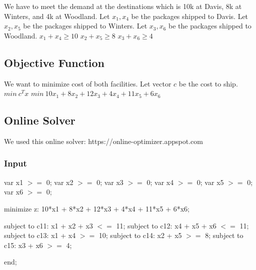 \documentclass[14pt]{extarticle}
\begin{document}
\bigskip

We have to meet the demand at the destinations which is 10k at Davis, 8k at Winters, and 4k at Woodland. Let $x_1, x_4$ be the packages shipped to Davis. Let $x_2, x_5$ be the packages shipped to Winters. Let $x_3, x_6$ be the packages shipped to Woodland.
\newline $x_1 + x_4 \geq 10$
\newline $x_2 + x_5 \geq 8$
\newline $x_3 + x_6 \geq 4$

\subsection*{Objective Function}
We want to minimize cost of both facilities. Let vector $c$ be the cost to ship.
\newline $min\ c^Tx$
\newline $min\ 10x_1 + 8x_2 + 12x_3 + 4x_4 + 11x_5 + 6x_6$

\subsection*{Online Solver}
We used this online solver: https://online-optimizer.appspot.com

\subsubsection*{Input}
         var x1 $>=$ 0;
\newline var x2 $>=$ 0;
\newline var x3 $>=$ 0;
\newline var x4 $>=$ 0;
\newline var x5 $>=$ 0;
\newline var x6 $>=$ 0;

\bigskip minimize z: 10*x1 + 8*x2 + 12*x3 + 4*x4 + 11*x5 + 6*x6;

\bigskip subject to c11: x1 + x2 + x3 $<=$ 11;
\newline subject to c12: x4 + x5 + x6 $<=$ 11;
\newline subject to c13: x1 + x4 $>=$ 10;
\newline subject to c14: x2 + x5 $>=$ 8;
\newline subject to c15: x3 + x6 $>=$ 4;

\bigskip end;
\end{document}

